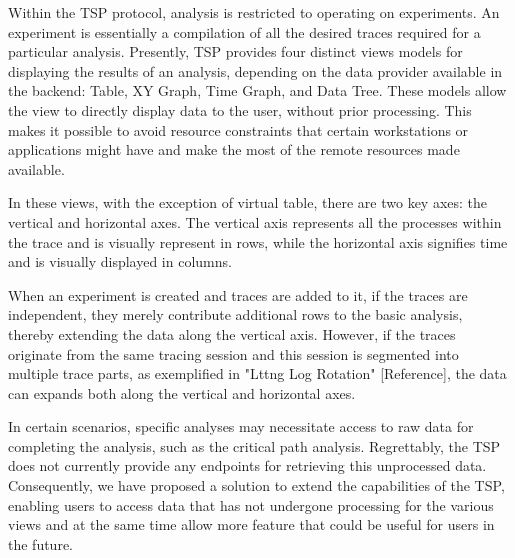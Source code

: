 Within the TSP protocol, analysis is restricted to operating on experiments. An experiment is essentially a compilation of all the desired traces required for a particular analysis. Presently, TSP provides four distinct views models for displaying the results of an analysis, depending on the data provider available in the backend: Table, XY Graph, Time Graph, and Data Tree. These models allow the view to directly display data to the user, without prior processing. This makes it possible to avoid resource constraints that certain workstations or applications might have and make the most of the remote resources made available.

In these views, with the exception of virtual table, there are two key axes: the vertical and horizontal axes. The vertical axis represents all the processes within the trace and is visually represent in rows, while the horizontal axis signifies time and is visually displayed in columns.

When an experiment is created and traces are added to it, if the traces are independent, they merely contribute additional rows to the basic analysis, thereby extending the data along the vertical axis. However, if the traces originate from the same tracing session and this session is segmented into multiple trace parts, as exemplified in "Lttng Log Rotation" [Reference], the data can expands both along the vertical and horizontal axes.

In certain scenarios, specific analyses may necessitate access to raw data for completing the analysis, such as the critical path analysis. Regrettably, the TSP does not currently provide any endpoints for retrieving this unprocessed data. Consequently, we have proposed a solution to extend the capabilities of the TSP, enabling users to access data that has not undergone processing for the various views and at the same time allow more feature that could be useful for users in the future.



